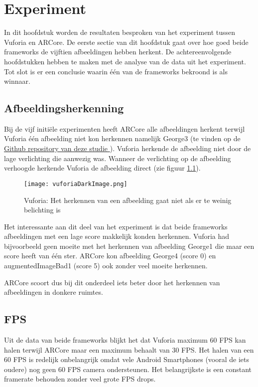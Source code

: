 \chapter{Experiment}
\label{ch:experiment}

In dit hoofdstuk worden de resultaten besproken van het experiment tussen Vuforia en ARCore. De eerste sectie van dit hoofdstuk gaat over hoe goed beide frameworks de vijftien afbeeldingen hebben herkent. De achtereenvolgende hoofdstukken hebben te maken met de analyse van de data uit het experiment. Tot slot is er een conclusie waarin één van de frameworks bekroond is als winnaar.

\section{Afbeeldingsherkenning}
Bij de vijf initiële experimenten heeft ARCore alle afbeeldingen herkent terwijl Vuforia één afbeelding niet kon herkennen namelijk George3 (te vinden op de \href{https://github.com/MatthiasDeFre/bachelorproef-hogent-2019}{Github repository van deze studie \autocite{GITHUBMDF}}). Vuforia herkende de afbeelding niet door de lage verlichting die aanwezig was. Wanneer de verlichting op de afbeelding verhoogde herkende Vuforia de afbeelding direct (zie figuur \ref{fig:vuforiaDarkImage}).

\begin{figure}
    \texttt{[image: vuforiaDarkImage.png]}
    \caption{Vuforia: Het herkennen van een afbeelding gaat niet als er te weinig belichting is}
    \label{fig:vuforiaDarkImage}
\end{figure}


Het interessante aan dit deel van het experiment is dat beide frameworks afbeeldingen met een lage score makkelijk konden herkennen. Vuforia had bijvoorbeeld geen moeite met het herkennen van afbeelding George1 die maar een score heeft van één ster. ARCore kon afbeelding George4 (score 0) en augmentedImageBad1 (score 5) ook zonder veel moeite herkennen.

ARCore scoort dus bij dit onderdeel iets beter door het herkennen van afbeeldingen in donkere ruimtes.

\section{FPS}\label{sec:fps}

Uit de data van beide frameworks blijkt het dat Vuforia maximum 60 FPS kan halen terwijl ARCore maar een maximum behaalt van 30 FPS. Het halen van een 60 FPS is redelijk onbelangrijk omdat vele Android Smartphones (vooral de iets oudere) nog geen 60 FPS camera ondersteunen. Het belangrijkste is een constant framerate behouden zonder veel grote FPS drops.

